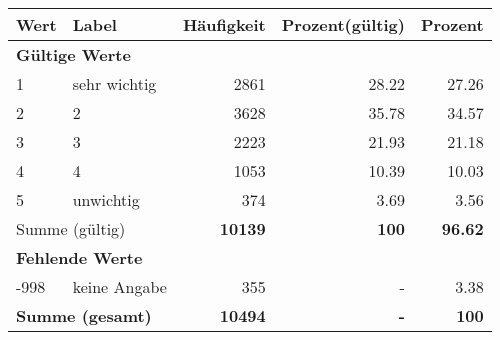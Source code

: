      \begin{longtable}{lXrrr}
     \toprule
     \textbf{Wert} & \textbf{Label} & \textbf{Häufigkeit} & \textbf{Prozent(gültig)} & \textbf{Prozent} \\
     \endhead
     \midrule
     \multicolumn{5}{l}{\textbf{Gültige Werte}}\\

     1 &
     \multicolumn{1}{X}{ sehr wichtig   } &


       \num{2861} &
       \num[round-mode=places,round-precision=2]{28.22} &
         \num[round-mode=places,round-precision=2]{27.26} \\

     2 &
     \multicolumn{1}{X}{ 2   } &


       \num{3628} &
       \num[round-mode=places,round-precision=2]{35.78} &
         \num[round-mode=places,round-precision=2]{34.57} \\

     3 &
     \multicolumn{1}{X}{ 3   } &


       \num{2223} &
       \num[round-mode=places,round-precision=2]{21.93} &
         \num[round-mode=places,round-precision=2]{21.18} \\

     4 &
     \multicolumn{1}{X}{ 4   } &


       \num{1053} &
       \num[round-mode=places,round-precision=2]{10.39} &
         \num[round-mode=places,round-precision=2]{10.03} \\

     5 &
     \multicolumn{1}{X}{ unwichtig   } &


       \num{374} &
       \num[round-mode=places,round-precision=2]{3.69} &
         \num[round-mode=places,round-precision=2]{3.56} \\
     \midrule
     \multicolumn{2}{l}{Summe (gültig)} &
       \textbf{\num{10139}} &
     \textbf{\num{100}} &
       \textbf{\num[round-mode=places,round-precision=2]{96.62}} \\
     \multicolumn{5}{l}{\textbf{Fehlende Werte}}\\
       -998 &
       keine Angabe &
         \num{355} &
        - &
         \num[round-mode=places,round-precision=2]{3.38} \\
     \midrule
     \multicolumn{2}{l}{\textbf{Summe (gesamt)}} &
          \textbf{\num{10494}} &
        \textbf{-} &
        \textbf{\num{100}} \\
     \bottomrule
     \end{longtable}
     

